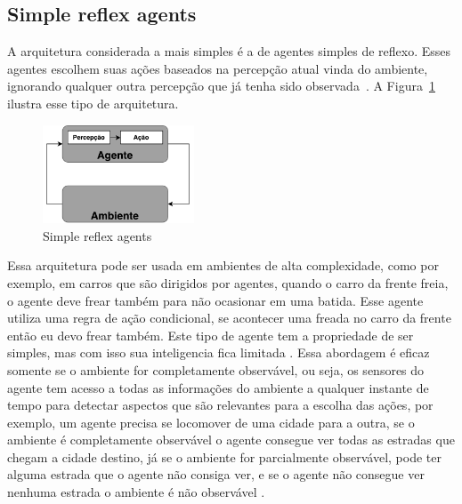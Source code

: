 \subsection{Simple reflex agents}
A arquitetura considerada a mais simples é a de agentes simples de reflexo. 
Esses agentes escolhem suas ações baseados na percepção atual vinda do ambiente, ignorando qualquer outra percepção que já tenha sido observada~\cite{intelligence2003modern}. 
A Figura~\ref{fig:agenteSimple} ilustra esse tipo de arquitetura. 

\begin{figure}[ht]
	\centering
	\includegraphics[width=0.4\textwidth]{fig/agentSimple.pdf}
	\caption{Simple reflex agents}
	\label{fig:agenteSimple}
\end{figure} 

Essa arquitetura pode ser usada em ambientes de alta complexidade, como por exemplo, em carros que são dirigidos por agentes, quando o carro da frente freia, o agente deve frear também para não ocasionar em uma batida.  
Esse agente utiliza uma regra de ação condicional, se acontecer uma freada no carro da frente então eu devo frear também. 
Este tipo de agente tem a propriedade de ser simples, mas com isso sua inteligencia fica limitada \cite{intelligence2003modern}. Essa abordagem é eficaz somente se o ambiente for completamente observável, ou seja, os sensores do agente tem acesso a todas as informações do ambiente a qualquer instante de tempo para detectar aspectos que são relevantes para a escolha das ações, por exemplo, um agente precisa se locomover de uma cidade para a outra, se o ambiente é completamente observável o agente consegue ver todas as estradas que chegam a cidade destino, já se o ambiente for parcialmente observável, pode ter alguma estrada que o agente não consiga ver, e se o agente não consegue ver nenhuma estrada o ambiente é não observável \cite{intelligence2003modern}. 

